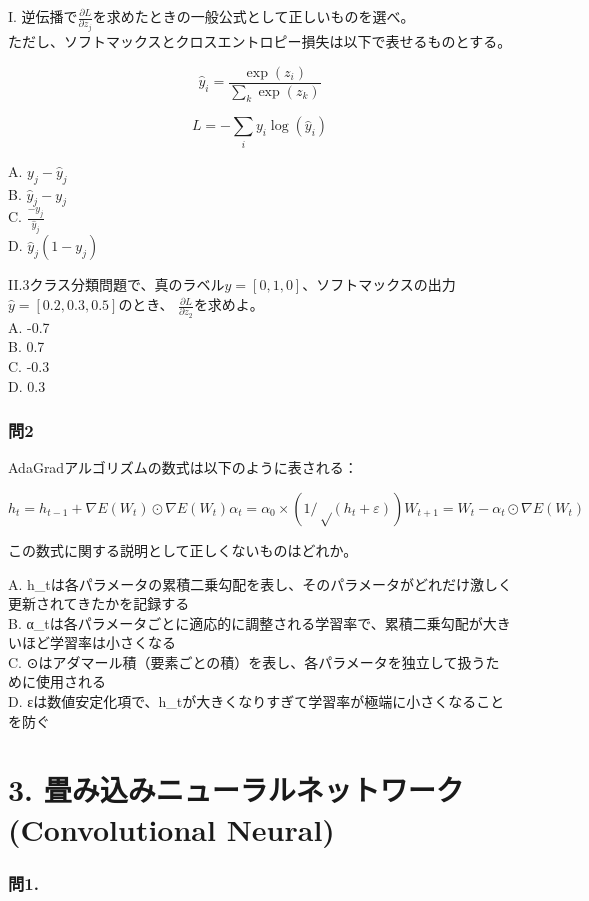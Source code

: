 \documentclass[
  letterpaper,
  DIV=11,
  numbers=noendperiod]{scrreprt}
\begin{document}
I.
逆伝播で\(\frac{∂𝐿}{∂𝑧_j}\)を求めたときの一般公式として正しいものを選べ。\\
ただし、ソフトマックスとクロスエントロピー損失は以下で表せるものとする。

\[
\hat{y}_i = \frac{\exp(z_i)}{\sum_{k} \exp(z_k)}
\]

\[
L = - \sum_{i} y_i \log(\hat{y}_i)
\]

A. \(𝑦_j−\hat{y}_j\)\\
B. \(\hat{y}_j-𝑦_j\)\\
C. \(\frac{-y_j}{\hat{y}_j}\)\\
D. \(\hat{y}_j(1-𝑦_j)\)

II.3クラス分類問題で、真のラベル\(y = [0,1,0]\)、ソフトマックスの出力\(\hat{y}=[0.2, 0.3, 0.5]\)のとき、
\(\frac{∂𝐿}{∂𝑧_2}\)を求めよ。\\
A. -0.7\\
B. 0.7\\
C. -0.3\\
D. 0.3

\subsection{問2}\label{ux554f2-1}

AdaGradアルゴリズムの数式は以下のように表される：

\[
h_t = h_{t-1} + ∇E(W_t) ⊙ ∇E(W_t)
α_t = α_0 × (1/√(h_t + ε))
W_{t+1} = W_t - α_t ⊙ ∇E(W_t)
\]

この数式に関する説明として正しくないものはどれか。

A.
h\_tは各パラメータの累積二乗勾配を表し、そのパラメータがどれだけ激しく更新されてきたかを記録する\\
B.
α\_tは各パラメータごとに適応的に調整される学習率で、累積二乗勾配が大きいほど学習率は小さくなる\\
C.
⊙はアダマール積（要素ごとの積）を表し、各パラメータを独立して扱うために使用される\\
D.
εは数値安定化項で、h\_tが大きくなりすぎて学習率が極端に小さくなることを防ぐ

\chapter{3. 畳み込みニューラルネットワーク (Convolutional
Neural)}\label{ux7573ux307fux8fbcux307fux30cbux30e5ux30fcux30e9ux30ebux30cdux30c3ux30c8ux30efux30fcux30af-convolutional-neural}

\subsection{問1.}\label{ux554f1.}
\end{document}
